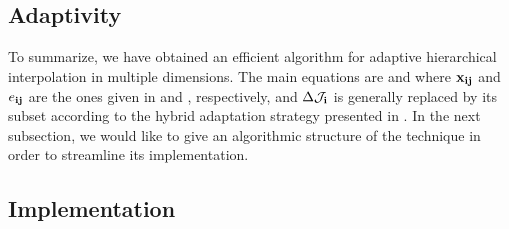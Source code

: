 \subsection{Adaptivity} 


To summarize, we have obtained an efficient algorithm for adaptive hierarchical
interpolation in multiple dimensions. The main equations are  and
 where $\mathbf{x}_{\mathbf{i}\mathbf{j}}$ and $e_{\mathbf{i}\mathbf{j}}$ are the ones
given in  and , respectively, and
$\Delta\mathcal{J}_{\mathbf{i}}$ is generally replaced by its subset according to the hybrid
adaptation strategy presented in . In the next subsection, we
would like to give an algorithmic structure of the technique in order to
streamline its implementation.

\subsection{Implementation} 


